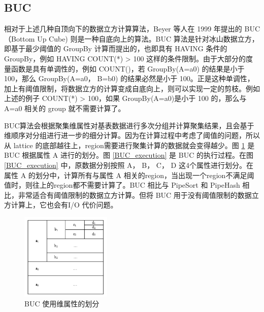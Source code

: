 
\subsection{BUC}

相对于上述几种自顶向下的数据立方计算算法，Beyer 等人在 1999 年提出的 BUC （Bottom Up Cube) 则是一种自底向上的算法。BUC 算法是针对冰山数据立方，即基于最少阈值的 GroupBy 计算而提出的，也即具有 HAVING 条件的 GroupBy，例如 HAVING COUNT(*) > 100 这样的条件限制。由于大部分的度量函数是具有单调性的，例如 COUNT()，若 GroupBy(A=a0) 的结果是小于 100，那么 GroupBy(A=a0， B=b0) 的结果必然是小于 100。正是这种单调性，加上有阈值限制，将数据立方的计算变成自底向上，则可以实现一定的剪枝。例如上述的例子 COUNT(*) > 100，如果 GroupBy(A=a0)是小于 100 的，那么与 A=a0 相关的 group 就不需要计算了。

BUC算法会根据聚集维属性对基表数据进行多次分组并计算聚集结果，且会基于维顺序对分组进行进一步的细分计算。因为在计算过程中考虑了阈值的问题，所以从 lattice 的底部越往上，region需要进行聚集计算的数据就会变得越少。图 \ref{BUC_partition} 是 BUC 根据属性 A 进行的划分。图 \ref{BUC_execution} 是 BUC 的执行过程。在图 \ref{BUC_execution} 中，原数据分别按照 A， B， C， D 这4个属性进行划分。在属性 A 的划分中，计算所有与属性 A 相关的region，当出现一个region不满足阈值时，则往上的region都不需要计算了。BUC 相比与 PipeSort 和 PipeHash 相比，非常适合有阈值限制的数据立方计算。但将 BUC 用于没有阈值限制的数据立方计算上，它也会有I/O 代价问题。

\begin{figure}[!htb]
\centering\includegraphics[width=1.7in]{picture/ch_current_research/BUC_partition} 
\caption{BUC 使用维属性的划分}\label{BUC_partition} 
\end{figure} 


